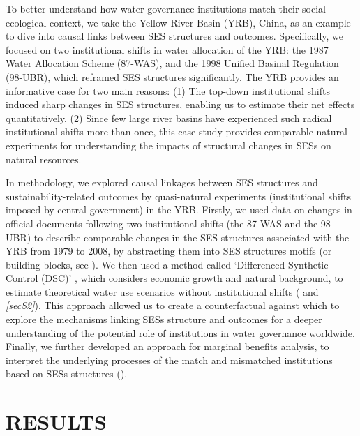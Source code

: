 \documentclass[default, sn-standardnature]{sn-jnl}
\begin{document}
To better understand how water governance institutions match their social-ecological context, we take the Yellow River Basin (YRB), China, as an example \textit{} to dive into causal links between SES structures and outcomes.
Specifically, we focused on two institutional shifts in water allocation of the YRB: the 1987 Water Allocation Scheme (87-WAS), and the 1998 Unified Basinal Regulation (98-UBR), which reframed SES structures significantly.
The YRB provides an informative case for two main reasons:
(1) The top-down institutional shifts induced sharp changes in SES structures, enabling us to estimate their net effects quantitatively.
(2) Since few large river basins have experienced such radical institutional shifts more than once, this case study provides comparable natural experiments for understanding the impacts of structural changes in SESs on natural resources.

In methodology, we explored causal linkages between SES structures and sustainability-related outcomes by quasi-natural experiments (institutional shifts imposed by central government) in the YRB.
Firstly, we used data on changes in official documents following two institutional shifts (the 87-WAS and the 98-UBR) to describe comparable changes in the SES structures associated with the YRB from 1979 to 2008, by abstracting them into SES structures motifs (or building blocks, see \textit{}).
We then used a method called `Differenced Synthetic Control (DSC)' \cite{arkhangelsky2021}, which considers economic growth and natural background, to estimate theoretical water use scenarios without institutional shifts (\textit{} and \textit{\ref{secS2}}).
This approach allowed us to create a counterfactual against which to explore the mechanisms linking SESs structure and outcomes for a deeper understanding of the potential role of institutions in water governance worldwide.
Finally, we further developed an approach for marginal benefits analysis, to interpret the underlying processes of the match and mismatched institutions based on SESs structures (\textit{}).


\section{RESULTS}\label{sec:results}

\end{document}
